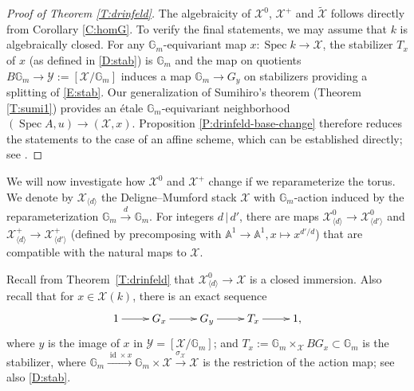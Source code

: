 \documentclass[a4paper]{amsart}
\theoremstyle{plain}
\theoremstyle{definition}
\theoremstyle{remark}
\numberwithin{equation}{section}
\newcommand{\GG}{\mathbb{G}}
\renewcommand\AA{\mathbb{A}}
\newcommand\cX{\mathcal{X}}
\newcommand\cY{\mathcal{Y}}
\newcommand\co{\colon}
\DeclareMathOperator{\Spec}{Spec}
\renewcommand{\tilde}{\widetilde}
\DeclareMathOperator{\id}{id}
\begin{document}
\begin{proof}[Proof of Theorem \ref{T:drinfeld}]  The algebraicity of $\cX^0$, $\cX^+$ and $\tilde{\cX}$ follows directly from Corollary \ref{C:homG}.  To verify the final statements, we may assume that $k$ is algebraically closed.  For any $\GG_m$-equivariant map $x \co \Spec k \to \cX$, the stabilizer $T_x$ of $x$ (as defined in \eqref{D:stab}) is $\GG_m$ and the map on quotients $B\GG_m \to \cY := [\cX/\GG_m]$ induces a map $\GG_m \to G_y$ on stabilizers providing a splitting of \eqref{E:stab}.  Our generalization of Sumihiro's theorem (Theorem \ref{T:sumi1}) provides an \'etale $\GG_m$-equivariant neighborhood $(\Spec A,u) \to (\cX,x)$.  Proposition \ref{P:drinfeld-base-change} therefore reduces the statements to the case of an affine scheme, which can be established directly; see \cite[\S 1.3.4]{drinfeld}.
\end{proof}

We will now investigate how $\cX^0$ and $\cX^+$ change if we reparameterize the
torus. We denote by $\cX_{\langle d \rangle}$  the Deligne--Mumford stack $\cX$ with $\GG_m$-action induced by the reparameterization $\GG_m \xrightarrow{d} \GG_m$.  For integers $d \, | \, d'$, there are maps $\cX^0_{\langle d \rangle} \to \cX^0_{\langle d' \rangle}$ and $\cX^+_{\langle d \rangle} \to \cX^+_{\langle d' \rangle}$ (defined by precomposing with $\AA^1 \to \AA^1, x \mapsto x^{d'/d}$) that are compatible with the natural maps to $\cX$.

Recall from Theorem~\ref{T:drinfeld} that $\cX^0_{\langle d \rangle}\to \cX$ is a closed immersion. Also recall that for $x \in \cX(k)$,  there is an exact sequence
\begin{equation} \label{E:stab2}
\xymatrix{1 \ar[r] & G_x \ar[r] &  G_y \ar[r] &  T_x \ar[r] & 1,}
\end{equation}
where $y$ is the image of $x$ in $\cY = [\cX/\GG_m]$; and $T_x := \GG_m \times_{\cX} BG_x \subset \GG_m$ is the stabilizer, where $\GG_m  \xrightarrow{\id \times x} \GG_m \times \cX \xrightarrow{\sigma_{\cX}} \cX$ is the restriction of the action map; see also \eqref{D:stab}.
\end{document}
